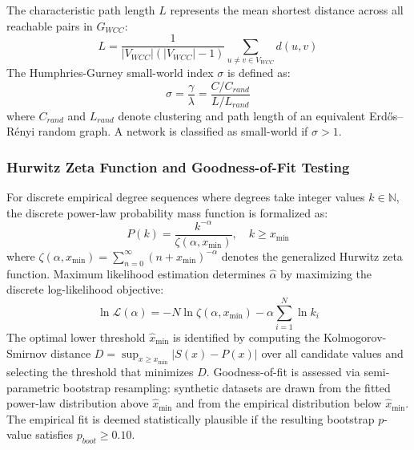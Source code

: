 \documentclass[conference]{IEEEtran}
\begin{document}
The characteristic path length $L$ represents the mean shortest distance across all reachable pairs in $G_{WCC}$:
\begin{equation}
    L = \frac{1}{|V_{WCC}|(|V_{WCC}| - 1)} \sum_{u \ne v \in V_{WCC}} d(u, v)
    \label{eq:pathlength}
\end{equation}
The Humphries-Gurney small-world index $\sigma$ is defined as:
\begin{equation}
    \sigma = \frac{\gamma}{\lambda} = \frac{C / C_{rand}}{L / L_{rand}}
    \label{eq:sigma}
\end{equation}
where $C_{rand}$ and $L_{rand}$ denote clustering and path length of an equivalent Erd\H{o}s--R\'enyi random graph. A network is classified as small-world if $\sigma > 1$.


\subsubsection{Hurwitz Zeta Function and Goodness-of-Fit Testing}
For discrete empirical degree sequences where degrees take integer values $k \in \mathbb{N}$, the discrete power-law probability mass function is formalized as:
\begin{equation}
    P(k) = \frac{k^{-\alpha}}{\zeta(\alpha, x_{\min})}, \quad k \ge x_{\min}
    \label{eq:hurwitz}
\end{equation}
where $\zeta(\alpha, x_{\min}) = \sum_{n=0}^{\infty} (n + x_{\min})^{-\alpha}$ denotes the generalized Hurwitz zeta function. Maximum likelihood estimation determines $\hat{\alpha}$ by maximizing the discrete log-likelihood objective:
\begin{equation}
    \ln \mathcal{L}(\alpha) = -N \ln \zeta(\alpha, x_{\min}) - \alpha \sum_{i=1}^N \ln k_i
    \label{eq:discrete_loglike}
\end{equation}
The optimal lower threshold $\hat{x}_{\min}$ is identified by computing the Kolmogorov-Smirnov distance $D = \sup_{x \ge x_{\min}} |S(x) - P(x)|$ over all candidate values and selecting the threshold that minimizes $D$. Goodness-of-fit is assessed via semi-parametric bootstrap resampling: synthetic datasets are drawn from the fitted power-law distribution above $\hat{x}_{\min}$ and from the empirical distribution below $\hat{x}_{\min}$. The empirical fit is deemed statistically plausible if the resulting bootstrap $p$-value satisfies $p_{boot} \ge 0.10$.
\end{document}
